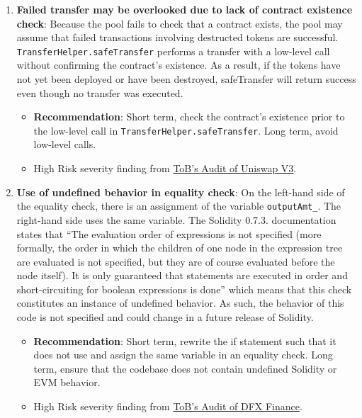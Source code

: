 \begin{enumerate}
\item\textbf{Failed transfer may be overlooked due to lack of contract existence check}: Because the pool fails to check that a contract exists, the pool may assume that failed transactions involving destructed tokens are successful. \verb|TransferHelper.safeTransfer| performs a transfer with a low-level call without confirming the contract’s existence. As a result, if the tokens have not yet been deployed or have been destroyed, safeTransfer will return success even though no transfer was executed.
	\begin{itemize}
	\item\textbf{Recommendation}: Short term, check the contract’s existence prior to the low-level call in \verb|TransferHelper.safeTransfer|. Long term, avoid low-level calls.
	\item High Risk severity finding from \href{https://github.com/Uniswap/uniswap-v3-core/blob/main/audits/tob/audit.pdf}{ToB’s Audit of Uniswap V3}.
	\end{itemize}

\item\textbf{Use of undefined behavior in equality check}: On the left-hand side of the equality check, there is an assignment of the variable \verb|outputAmt_|. The right-hand side uses the same variable. The Solidity 0.7.3. documentation states that “The evaluation order of expressions is not specified (more formally, the order in which the children of one node in the expression tree are evaluated is not specified, but they are of course evaluated before the node itself). It is only guaranteed that statements are executed in order and short-circuiting for boolean expressions is done” which means that this check constitutes an instance of undefined behavior. As such, the behavior of this code is not specified and could change in a future release of Solidity.
	\begin{itemize}
	\item\textbf{Recommendation}: Short term, rewrite the if statement such that it does not use and assign the same variable in an equality check. Long term, ensure that the codebase does not contain undefined Solidity or EVM behavior.
	\item High Risk severity finding from \href{https://github.com/dfx-finance/protocol/blob/main/audits/2021-05-03-Trail_of_Bits.pdf}{ToB’s Audit of DFX Finance}.
	\end{itemize}


\end{enumerate}
